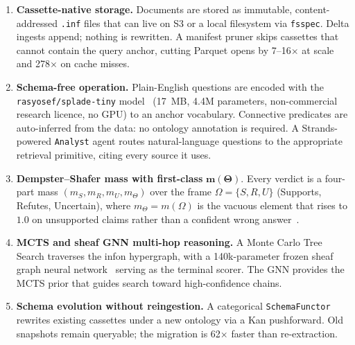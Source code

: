 \begin{enumerate}
  \item \textbf{Cassette-native storage.}  Documents are stored as immutable,
    content-addressed \texttt{.inf} files that can live on S3 or a local
    filesystem via \texttt{fsspec}. Delta ingests append; nothing is rewritten.
    A manifest pruner skips cassettes that cannot contain the query anchor,
    cutting Parquet opens by 7--16$\times$ at scale and 278$\times$ on cache
    misses.

  \item \textbf{Schema-free operation.}  Plain-English questions are encoded
    with the \texttt{rasyosef/splade-tiny} model~\cite{alemneh2025spladetiny}
    (17~MB, 4.4M parameters, non-commercial research licence, no GPU) to an
    anchor vocabulary. Connective predicates are auto-inferred from the
    data: no ontology annotation is required. A Strands-powered \texttt{Analyst}
    agent routes natural-language questions to the appropriate retrieval
    primitive, citing every source it uses.

  \item \textbf{Dempster--Shafer mass with first-class} $\boldsymbol{m(\Theta)}$.
    Every verdict is a four-part mass $(m_S, m_R, m_U, m_\Theta)$ over the
    frame $\Omega = \{S, R, U\}$ (Supports, Refutes, Uncertain), where
    $m_\Theta = m(\Omega)$ is the vacuous element that rises to $1.0$ on
    unsupported claims rather than a confident wrong answer~\cite{shafer1976mathematical}.

  \item \textbf{MCTS and sheaf GNN multi-hop reasoning.}  A Monte Carlo Tree
    Search traverses the infon hypergraph, with a 140k-parameter frozen sheaf
    graph neural network~\cite{bodnar2022sheaf} serving as the terminal scorer.
    The GNN provides the MCTS prior that guides search toward high-confidence
    chains.

  \item \textbf{Schema evolution without reingestion.}  A categorical
    \texttt{SchemaFunctor} rewrites existing cassettes under a new ontology
    via a Kan pushforward. Old snapshots remain queryable; the migration is
    62$\times$ faster than re-extraction.
\end{enumerate}

